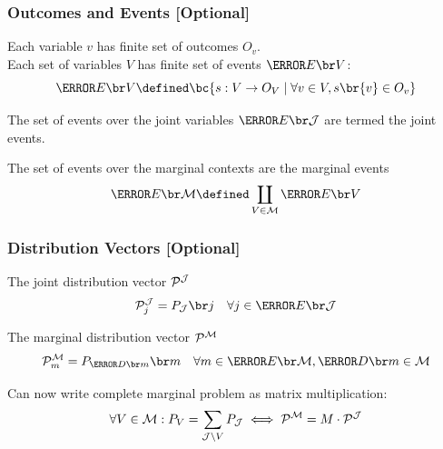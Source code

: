 \documentclass[
    hyperref={bookmarks=false},%
    xcolor={dvipsnames},
]{beamer}
\renewcommand{\term}[1]{\textcolor{Mahogany}{#1}}
\renewcommand{\tcdot}{\cdot} %
\begin{document}
\begin{frame}
    \frametitle{Outcomes and Events [Optional]}
    \begin{definition}
        Each variable $v$ has finite set of \term{outcomes} $O_v$. \\
        Each set of variables $V$ has finite set of \term{events} $\Events{V}$:
        \[ \Events{V} \defined \bc{s: V \to O_V \mid \forall v \in V, s\br{v} \in O_v} \]
    \end{definition}
    \begin{definition}
        The set of events over the joint variables $\Events{\jointvar}$ are termed the \term{joint events}.
    \end{definition}
    \begin{definition}
        The set of events over the marginal contexts are the \term{marginal events}
        \[ \Events{\mscenario} \defined \coprod_{V \in \mscenario} \Events{V} \]
    \end{definition}
\end{frame}

\begin{frame}
    \frametitle{Distribution Vectors [Optional]}
    \begin{definition}
        The \term{joint distribution vector} $\probvec^{\jointvar}$
        \[ \probvec^{\jointvar}_j = \prob[\jointvar][j] \quad \forall j \in \Events{\jointvar}\]
    \end{definition}
    \begin{definition}
        The \term{marginal distribution vector} $\probvec^{\mscenario}$
        \[ \probvec^{\mscenario}_m = \prob[\Dom{m}][m] \quad \forall m \in \Events{\mscenario}, \Dom{m} \in \mscenario\]
    \end{definition}
    Can now write complete marginal problem as matrix multiplication:
    \[ \forall V \in \mscenario : \prob[V] = \sum_{\jointvar \setminus V} \prob[\jointvar] \iff \probvec^{\mscenario} = M \tcdot \probvec^{\jointvar} \]
\end{frame}
\end{document}
